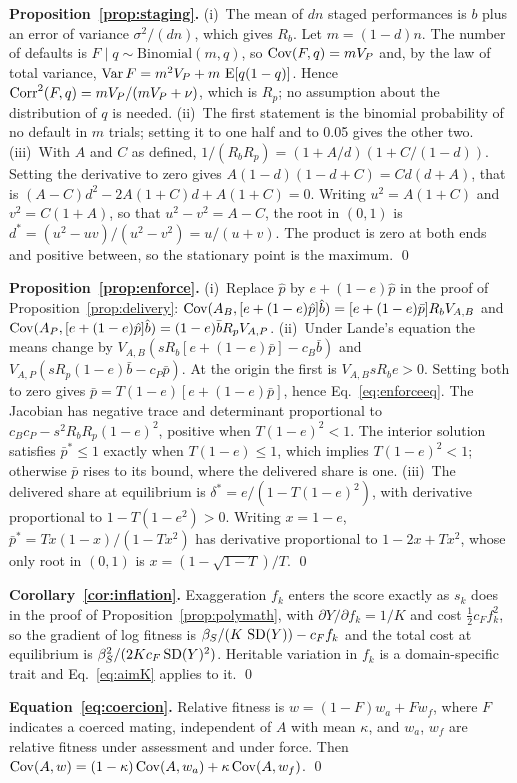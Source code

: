 \textbf{Proposition~\ref{prop:staging}.} (i)~The mean of $dn$ staged performances is $b$ plus an error of variance
$\sigma^2/(dn)$, which gives $R_b$. Let $m=(1-d)n$. The number of defaults is $F\mid q\sim\mathrm{Binomial}(m,q)$, so
$\operatorname{Cov}(F,q)=mV_P$ and, by the law of total variance, $\operatorname{Var} F=m^2V_P+m\,\operatorname{E}[q(1-q)]$. Hence
$\operatorname{Corr}^2(F,q)=mV_P/(mV_P+\nu)$, which is $R_p$; no assumption about the distribution of $q$ is needed. (ii)~The first
statement is the binomial probability of no default in $m$ trials; setting it to one half and to 0.05 gives the other two.
(iii)~With $A$ and $C$ as defined, $1/(R_bR_p)=(1+A/d)(1+C/(1-d))$. Setting the derivative to zero gives
$A(1-d)(1-d+C)=Cd(d+A)$, that is $(A-C)d^2-2A(1+C)d+A(1+C)=0$. Writing $u^2=A(1+C)$ and $v^2=C(1+A)$, so that
$u^2-v^2=A-C$, the root in $(0,1)$ is $d^*=(u^2-uv)/(u^2-v^2)=u/(u+v)$. The product is zero at both ends and positive
between, so the stationary point is the maximum. \qed

\textbf{Proposition~\ref{prop:enforce}.} (i)~Replace $\hat p$ by $e+(1-e)\hat p$ in the proof of
Proposition~\ref{prop:delivery}: $\operatorname{Cov}(A_B,[e+(1-e)\hat p]\hat b)=[e+(1-e)\bar p]R_bV_{A,B}$ and
$\operatorname{Cov}(A_P,[e+(1-e)\hat p]\hat b)=(1-e)\bar bR_pV_{A,P}$. (ii)~Under Lande's equation the means change by
$V_{A,B}(sR_b[e+(1-e)\bar p]-c_B\bar b)$ and $V_{A,P}(sR_p(1-e)\bar b-c_P\bar p)$. At the origin the first is $V_{A,B}sR_be>0$.
Setting both to zero gives $\bar p=T(1-e)[e+(1-e)\bar p]$, hence Eq.~\eqref{eq:enforceeq}. The Jacobian has negative trace
and determinant proportional to $c_Bc_P-s^2R_bR_p(1-e)^2$, positive when $T(1-e)^2<1$. The interior solution satisfies
$\bar p^*\le1$ exactly when $T(1-e)\le1$, which implies $T(1-e)^2<1$; otherwise $\bar p$ rises to its bound, where the
delivered share is one. (iii)~The delivered share at equilibrium is $\delta^*=e/(1-T(1-e)^2)$, with derivative proportional
to $1-T(1-e^2)>0$. Writing $x=1-e$, $\bar p^*=Tx(1-x)/(1-Tx^2)$ has derivative proportional to $1-2x+Tx^2$, whose only root
in $(0,1)$ is $x=(1-\sqrt{1-T})/T$. \qed

\textbf{Corollary~\ref{cor:inflation}.} Exaggeration $f_k$ enters the score exactly as $s_k$ does in the proof of
Proposition~\ref{prop:polymath}, with $\partial Y/\partial f_k=1/K$ and cost $\tfrac12c_Ff_k^2$, so the gradient of log
fitness is $\beta_S/(K\,\operatorname{SD}(Y))-c_Ff_k$ and the total cost at equilibrium is $\beta_S^2/(2Kc_F\operatorname{SD}(Y)^2)$. Heritable variation
in $f_k$ is a domain-specific trait and Eq.~\eqref{eq:aimK} applies to it. \qed

\textbf{Equation~\eqref{eq:coercion}.} Relative fitness is $w=(1-F)w_a+Fw_f$, where $F$ indicates a coerced mating,
independent of $A$ with mean $\kappa$, and $w_a$, $w_f$ are relative fitness under assessment and under force. Then
$\operatorname{Cov}(A,w)=(1-\kappa)\operatorname{Cov}(A,w_a)+\kappa\operatorname{Cov}(A,w_f)$. \qed

